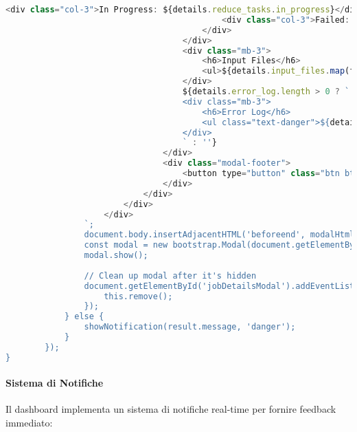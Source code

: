 \documentclass[12pt,a4paper]{article}
\begin{document}
\begin{lstlisting}[language=javascript, caption=Modal Job Details]
                                            <div class="col-3">In Progress: ${details.reduce_tasks.in_progress}</div>
                                            <div class="col-3">Failed: ${details.reduce_tasks.failed}</div>
                                        </div>
                                    </div>
                                    <div class="mb-3">
                                        <h6>Input Files</h6>
                                        <ul>${details.input_files.map(file => `<li>${file}</li>`).join('')}</ul>
                                    </div>
                                    ${details.error_log.length > 0 ? `
                                    <div class="mb-3">
                                        <h6>Error Log</h6>
                                        <ul class="text-danger">${details.error_log.map(error => `<li>${error}</li>`).join('')}</ul>
                                    </div>
                                    ` : ''}
                                </div>
                                <div class="modal-footer">
                                    <button type="button" class="btn btn-secondary" data-bs-dismiss="modal">Close</button>
                                </div>
                            </div>
                        </div>
                    </div>
                `;
                document.body.insertAdjacentHTML('beforeend', modalHtml);
                const modal = new bootstrap.Modal(document.getElementById('jobDetailsModal'));
                modal.show();
                
                // Clean up modal after it's hidden
                document.getElementById('jobDetailsModal').addEventListener('hidden.bs.modal', function() {
                    this.remove();
                });
            } else {
                showNotification(result.message, 'danger');
            }
        });
}
\end{lstlisting}

\paragraph{Sistema di Notifiche}
Il dashboard implementa un sistema di notifiche real-time per fornire feedback immediato:
\end{document}
